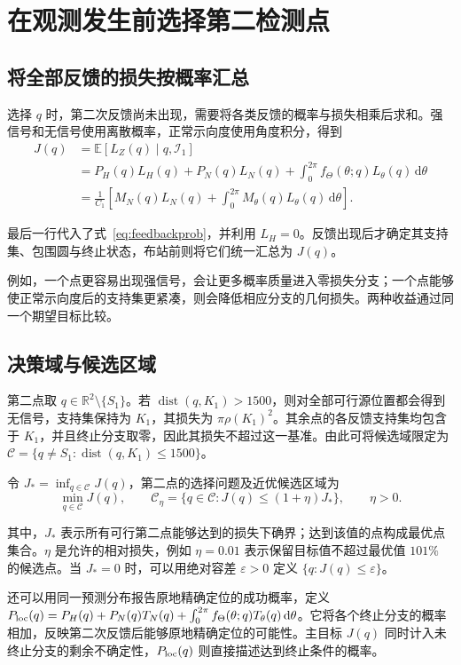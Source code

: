 \documentclass[UTF8,a4paper,zihao=-4,fontset=none]{ctexart}
\numberwithin{equation}{section}
\newcommand{\dd}{\,\mathrm d}
\newcommand{\E}{\mathbb E}
\newcommand{\dist}{\operatorname{dist}}
\begin{document}
\section{在观测发生前选择第二检测点}
\subsection{将全部反馈的损失按概率汇总}
选择 \(q\) 时，第二次反馈尚未出现，需要将各类反馈的概率与损失相乘后求和。强信号和无信号使用离散概率，正常示向度使用角度积分，得到
\begin{equation}\label{eq:objective}
\begin{aligned}
J(q)&=\E[L_Z(q)\mid q,\mathcal I_1]\\
&=P_H(q)L_H(q)+P_N(q)L_N(q)
 +\int_0^{2\pi}f_\Theta(\theta;q)L_\theta(q)\dd\theta\\
&=\frac{1}{C_1}\left[M_N(q)L_N(q)
 +\int_0^{2\pi}M_\theta(q)L_\theta(q)\dd\theta\right].
\end{aligned}
\end{equation}

最后一行代入了式~\eqref{eq:feedbackprob}，并利用 \(L_H=0\)。反馈出现后才确定其支持集、包围圆与终止状态，布站前则将它们统一汇总为 \(J(q)\)。

例如，一个点更容易出现强信号，会让更多概率质量进入零损失分支；一个点能够使正常示向度后的支持集更紧凑，则会降低相应分支的几何损失。两种收益通过同一个期望目标比较。

\subsection{决策域与候选区域}
第二点取 \(q\in\mathbb R^2\setminus\{S_1\}\)。若 \(\dist(q,K_1)>1500\)，则对全部可行源位置都会得到无信号，支持集保持为 \(K_1\)，其损失为 \(\pi\rho(K_1)^2\)。其余点的各反馈支持集均包含于 \(K_1\)，并且终止分支取零，因此其损失不超过这一基准。由此可将候选域限定为 \(\mathcal C=\{q\ne S_1:\dist(q,K_1)\le1500\}\)。

令 \(J_*=\inf_{q\in\mathcal C}J(q)\)，第二点的选择问题及近优候选区域为
\begin{equation}\label{eq:optimization}
\min_{q\in\mathcal C}J(q),\qquad
\mathcal C_\eta=\{q\in\mathcal C:J(q)\le(1+\eta)J_*\},\qquad \eta>0.
\end{equation}

其中，\(J_*\) 表示所有可行第二点能够达到的损失下确界；达到该值的点构成最优点集合。\(\eta\) 是允许的相对损失，例如 \(\eta=0.01\) 表示保留目标值不超过最优值 \(101\%\) 的候选点。当 \(J_*=0\) 时，可以用绝对容差 \(\varepsilon>0\) 定义 \(\{q:J(q)\le\varepsilon\}\)。

还可以用同一预测分布报告原地精确定位的成功概率，定义 \(P_{\rm loc}(q)=P_H(q)+P_N(q)T_N(q)+\int_0^{2\pi}f_\Theta(\theta;q)T_\theta(q)\dd\theta\)。它将各个终止分支的概率相加，反映第二次反馈后能够原地精确定位的可能性。主目标 \(J(q)\) 同时计入未终止分支的剩余不确定性，\(P_{\rm loc}(q)\) 则直接描述达到终止条件的概率。
\end{document}
